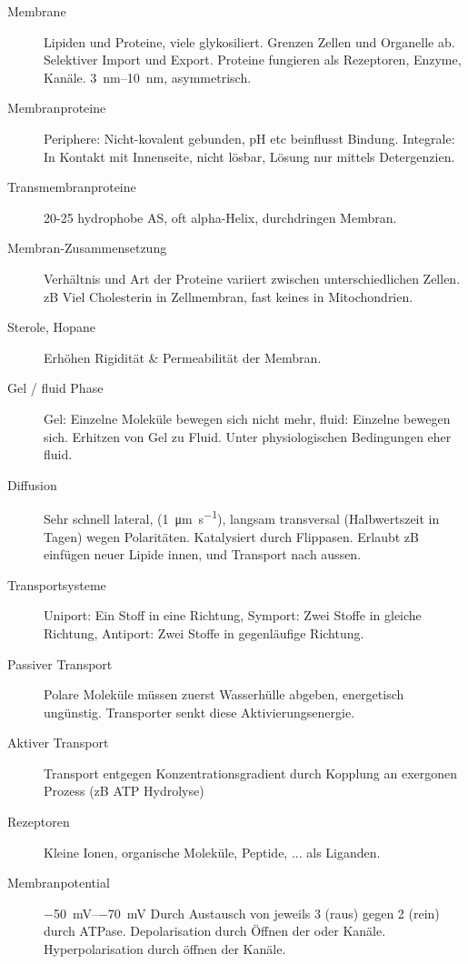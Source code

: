 \documentclass[a4paper,twocolumn,usegeometry,english,fontsize=6,DIV=16]{scrartcl}
\begin{document}
\begin{description}
	\item[Membrane] Lipiden und Proteine, viele glykosiliert. Grenzen
		Zellen und Organelle ab. Selektiver Import und Export. Proteine
		fungieren als Rezeptoren, Enzyme, Kanäle. \SIrange{3}{10}{\nm},
		asymmetrisch.
	\item[Membranproteine] Periphere: Nicht-kovalent gebunden, pH etc
		beinflusst Bindung. Integrale: In Kontakt mit Innenseite, nicht
		lösbar, Lösung nur mittels Detergenzien.
	\item[Transmembranproteine] 20-25 hydrophobe AS, oft alpha-Helix,
		durchdringen Membran.
	\item[Membran-Zusammensetzung] Verhältnis und Art der Proteine variiert
		zwischen unterschiedlichen Zellen. zB Viel Cholesterin in
		Zellmembran, fast keines in Mitochondrien.
	\item[Sterole, Hopane] Erhöhen Rigidität \& Permeabilität der Membran.
	\item[Gel / fluid Phase] Gel: Einzelne Moleküle bewegen sich nicht
		mehr, fluid: Einzelne bewegen sich. Erhitzen von Gel zu Fluid.
		Unter physiologischen Bedingungen eher fluid.
	\item[Diffusion] Sehr schnell lateral, (\SI{1}{\um \per \s}), langsam
		transversal (Halbwertszeit in Tagen) wegen Polaritäten.
		Katalysiert durch Flippasen. Erlaubt zB einfügen neuer Lipide
		innen, und Transport nach aussen.
	\item[Transportsysteme] Uniport: Ein Stoff in eine Richtung, Symport:
		Zwei Stoffe in gleiche Richtung, Antiport: Zwei Stoffe in
		gegenläufige Richtung.
	\item[Passiver Transport] Polare Moleküle müssen zuerst Wasserhülle
		abgeben, energetisch ungünstig. Transporter senkt diese
		Aktivierungsenergie.
	\item[Aktiver Transport] Transport entgegen Konzentrationsgradient
		durch Kopplung an exergonen Prozess (zB ATP Hydrolyse)
	\item[Rezeptoren] Kleine Ionen, organische Moleküle, Peptide, ... als
		Liganden.
	\item[Membranpotential] \SIrange{-50}{-70}{\mV} Durch Austausch von
		jeweils 3  (raus) gegen 2  (rein) durch ATPase.
		Depolarisation durch Öffnen der  oder  Kanäle.
		Hyperpolarisation durch öffnen der  Kanäle.
\end{description}
\end{document}
